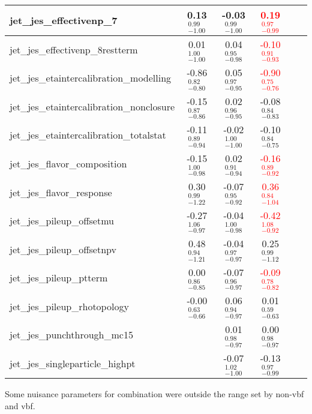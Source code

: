 \documentclass{beamer}
\begin{document}
\begin{frame}
\begin{table}
{{\begin{tabular}{| l | c | c | c| c | c |}
jet\_jes\_effectivenp\_7                 &  0.13 \boldmath${^{ 0.99}_{-1.00}}$      &  -0.03 \boldmath${^{ 0.99}_{-1.00}}$    &  \textcolor{red}{ 0.19 \boldmath${^{ 0.97}_{-0.99}}$ }     \\ \hline
jet\_jes\_effectivenp\_8restterm         & 0.01 \boldmath${^{ 1.00}_{-1.00}}$      &  0.04 \boldmath${^{ 0.95}_{-0.98}}$     &  \textcolor{red}{ -0.10 \boldmath${^{ 0.91}_{-0.93}}$    }  \\ \hline
jet\_jes\_etaintercalibration\_modelling &  -0.86 \boldmath${^{ 0.82}_{-0.80}}$      &  0.05 \boldmath${^{ 0.97}_{-0.95}}$    &  \textcolor{red}{ -0.90 \boldmath${^{ 0.75}_{-0.76}}$   } \\ \hline
jet\_jes\_etaintercalibration\_nonclosure& -0.15 \boldmath${^{ 0.87}_{-0.86}}$      &  0.02 \boldmath${^{ 0.96}_{-0.95}}$    & -0.08 \boldmath${^{ 0.84}_{-0.83}}$     \\ \hline
jet\_jes\_etaintercalibration\_totalstat & -0.11 \boldmath${^{ 0.89}_{-0.94}}$      &-0.02 \boldmath${^{ 1.00}_{-1.00}}$     & -0.10 \boldmath${^{ 0.84}_{-0.75}}$    \\ \hline
jet\_jes\_flavor\_composition            &  -0.15 \boldmath${^{ 1.00}_{-0.98}}$      & 0.02 \boldmath${^{ 0.91}_{-0.94}}$     & \textcolor{red}{ -0.16 \boldmath${^{ 0.89}_{-0.92}}$    } \\ \hline
jet\_jes\_flavor\_response               & 0.30 \boldmath${^{ 0.99}_{-1.22}}$      & -0.07 \boldmath${^{ 0.95}_{-0.92}}$     & \textcolor{red}{ 0.36 \boldmath${^{ 0.84}_{-1.04}}$   } \\ \hline
jet\_jes\_pileup\_offsetmu               & -0.27 \boldmath${^{ 1.06}_{-0.97}}$      & -0.04 \boldmath${^{ 1.00}_{-0.98}}$     & \textcolor{red}{ -0.42 \boldmath${^{ 1.08}_{-0.92}}$    } \\ \hline
jet\_jes\_pileup\_offsetnpv              &  0.48 \boldmath${^{ 0.94}_{-1.21}}$      &  -0.04 \boldmath${^{ 0.97}_{-0.97}}$     & 0.25 \boldmath${^{ 0.99}_{-1.12}}$    \\ \hline
jet\_jes\_pileup\_ptterm                 &  0.00 \boldmath${^{ 0.86}_{-0.85}}$      &  -0.07 \boldmath${^{ 0.96}_{-0.97}}$     & \textcolor{red}{ -0.09 \boldmath${^{ 0.78}_{-0.82}}$   } \\ \hline
jet\_jes\_pileup\_rhotopology            & -0.00 \boldmath${^{ 0.63}_{-0.66}}$      &  0.06 \boldmath${^{ 0.94}_{-0.97}}$     & 0.01 \boldmath${^{ 0.59}_{-0.63}}$     \\ \hline
jet\_jes\_punchthrough\_mc15             &                                        & 0.01 \boldmath${^{ 0.98}_{-0.97}}$     & 0.00 \boldmath${^{ 0.98}_{-0.97}}$   \\ \hline
jet\_jes\_singleparticle\_highpt         &                                        & -0.07 \boldmath${^{ 1.02}_{-1.00}}$     &  -0.13 \boldmath${^{ 0.97}_{-0.99}}$   \\ \hline

\end{tabular}
}}
\end{table}

Some nuisance parameters for combination were outside the range set by non-vbf and vbf.

\end{frame}
\end{document}
